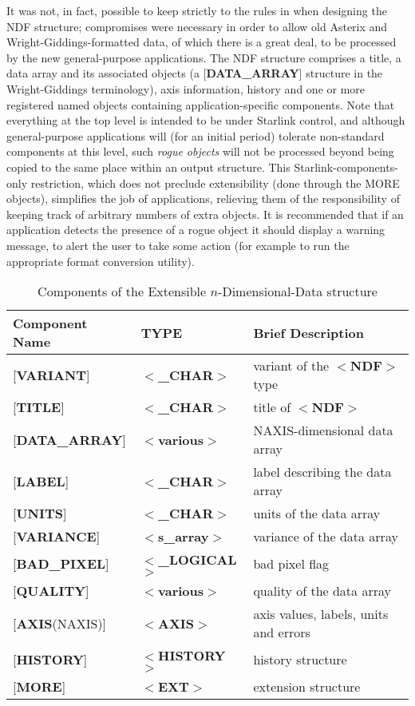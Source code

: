 \documentclass[twoside,11pt,nolof,noabs]{starlink}
\begin{document}
It was not, in fact, possible to keep strictly to
the rules in  when designing the NDF structure;
compromises were necessary in order to
allow old Asterix and Wright-Giddings-formatted data,
of which there is a great deal,
to be processed by the new general-purpose applications.
The NDF structure comprises a title, a data array and its associated objects
(a {[}\textbf{DATA\_ARRAY}{]} structure in the Wright-Giddings terminology),
axis information, history and one or more registered named objects containing
application-specific components.
Note that everything at the top level is intended to be under Starlink
control, and although general-purpose applications will (for
an initial period) tolerate
non-standard components at this level, such
\textit{rogue objects} will not be processed beyond being
copied to the same place within an output structure.  This
Starlink-components-only restriction, which does
not preclude extensibility (done through the MORE objects),
simplifies the job of applications,
relieving them of the responsibility
of keeping track of arbitrary
numbers of extra objects.
It is recommended that if an
application detects the presence of a
rogue object it should
display a warning message, to alert the user to
take some action (for example to run the
appropriate format conversion utility).

\begin{table}
\centering
\caption{Components of the Extensible $n$-Dimensional-Data structure}
\begin{tabular}{|l|l|l|}
\hline
Component Name & TYPE & Brief Description \\ \hline
{[}\textbf{VARIANT}{]} & $<$\textbf{\_CHAR}$>$ & variant of the $<$\textbf{NDF}$>$ type \\
{[}\textbf{TITLE}{]} & $<$\textbf{\_CHAR}$>$ & title of $<$\textbf{NDF}$>$ \\
{[}\textbf{DATA\_ARRAY}{]} & $<$\textbf{various}$>$ & NAXIS-dimensional data array \\
{[}\textbf{LABEL}{]} & $<$\textbf{\_CHAR}$>$ & label describing the data array \\
{[}\textbf{UNITS}{]} & $<$\textbf{\_CHAR}$>$ & units of the data array \\
{[}\textbf{VARIANCE}{]} & $<$\textbf{s\_array}$>$ & variance of the data array \\
{[}\textbf{BAD\_PIXEL}{]} & $<$\textbf{\_LOGICAL}$>$ & bad pixel flag \\
{[}\textbf{QUALITY}{]} & $<$\textbf{various}$>$ & quality of the data array \\
{[}\textbf{AXIS}(NAXIS){]} & $<$\textbf{AXIS}$>$ & axis values, labels, units and errors \\
{[}\textbf{HISTORY}{]} & $<$\textbf{HISTORY}$>$ & history structure \\
{[}\textbf{MORE}{]} & $<$\textbf{EXT}$>$  & extension structure \\ \hline
\end{tabular}
\end{table}
\end{document}
